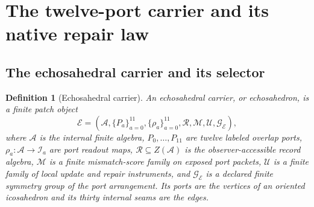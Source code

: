 \documentclass[11pt]{article}
\newtheorem{definition}[theorem]{Definition}
\theoremstyle{remark}
\theoremstyle{plain}
\begin{document}
\section{The twelve-port carrier and its native repair law}
\label{sec:twelve-port-carrier}

\subsection{The echosahedral carrier and its selector}

\begin{definition}[Echosahedral carrier]
\label{def:echosahedral-carrier}
An \emph{echosahedral carrier}, or echosahedron, is a finite patch object
\[
\mathcal E=(\mathcal A,\{P_a\}_{a=0}^{11},\{\rho_a\}_{a=0}^{11},
\mathcal R,\mathcal M,\mathcal U,\mathcal G_{\mathcal E}),
\]
where \(\mathcal A\) is the internal finite algebra, \(P_0,\ldots,P_{11}\) are
twelve labeled overlap ports, \(\rho_a:\mathcal A\to\mathcal I_a\) are port
readout maps, \(\mathcal R\subseteq Z(\mathcal A)\) is the observer-accessible
record algebra, \(\mathcal M\) is a finite mismatch-score family on exposed
port packets, \(\mathcal U\) is a finite family of local update and repair
instruments, and \(\mathcal G_{\mathcal E}\) is a declared finite symmetry
group of the port arrangement. Its ports are the vertices of an oriented
icosahedron and its thirty internal seams are the edges.
\end{definition}
\end{document}
